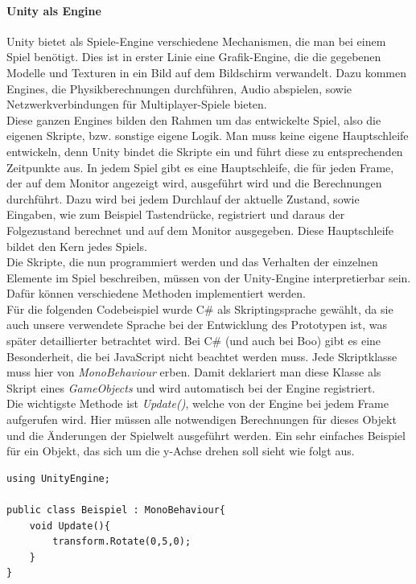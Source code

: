 \paragraph{Unity als Engine} Unity bietet als Spiele-Engine verschiedene Mechanismen, die man bei einem Spiel benötigt. Dies ist in erster Linie eine Grafik-Engine, die die gegebenen Modelle und Texturen in ein Bild auf dem Bildschirm verwandelt. Dazu kommen Engines, die Physikberechnungen durchführen, Audio abspielen, sowie Netzwerkverbindungen für Multiplayer-Spiele bieten.\\
Diese ganzen Engines bilden den Rahmen um das entwickelte Spiel, also die eigenen Skripte, bzw. sonstige eigene Logik. Man muss keine eigene Hauptschleife entwickeln, denn Unity bindet die Skripte ein und führt diese zu entsprechenden Zeitpunkte aus. In jedem Spiel gibt es eine Hauptschleife, die für jeden Frame, der auf dem Monitor angezeigt wird, ausgeführt wird und die Berechnungen durchführt. Dazu wird bei jedem Durchlauf der aktuelle Zustand, sowie Eingaben, wie zum Beispiel Tastendrücke, registriert und daraus der Folgezustand berechnet und auf dem Monitor ausgegeben. Diese Hauptschleife bildet den Kern jedes Spiels.\\
Die Skripte, die nun programmiert werden und das Verhalten der einzelnen Elemente im Spiel beschreiben, müssen von der Unity-Engine interpretierbar sein. Dafür können verschiedene Methoden implementiert werden. \\
Für die folgenden Codebeispiel wurde C\# als Skriptingsprache gewählt, da sie auch unsere verwendete Sprache bei der Entwicklung des Prototypen ist, was später detaillierter betrachtet wird. Bei C\# (und auch bei Boo) gibt es eine Besonderheit, die bei JavaScript nicht beachtet werden muss. Jede Skriptklasse muss hier von \textit{MonoBehaviour} erben. Damit deklariert man diese Klasse als Skript eines \textit{GameObjects} und wird automatisch bei der Engine registriert.\\
Die wichtigste Methode ist \textit{Update()}, welche von der Engine bei jedem Frame aufgerufen wird. Hier müssen alle notwendigen Berechnungen für dieses Objekt und die Änderungen der Spielwelt ausgeführt werden.
Ein sehr einfaches Beispiel für ein Objekt, das sich um die y-Achse drehen soll sieht wie folgt aus.\\

\begin{lstlisting}[caption={[Einfache Skript-Klasse mit Update-Methode]Einfache Skript-Klasse mit Update-Methode}]
using UnityEngine;

public class Beispiel : MonoBehaviour{
	void Update(){
		transform.Rotate(0,5,0);
	}
}
\end{lstlisting}

